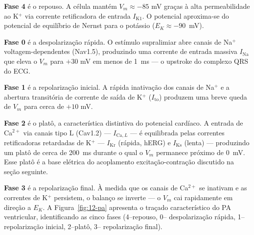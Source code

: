 \textbf{Fase 4} é o repouso. A célula mantém $V_m \approx -85$ mV graças
à alta permeabilidade ao K$^+$ via corrente retificadora de entrada
$I_{\mathrm{K1}}$. O potencial aproxima-se do potencial de equilíbrio de
Nernst para o potássio ($E_K \approx -90$~mV).

\textbf{Fase 0} é a despolarização rápida. O estímulo supralimiar abre
canais de Na$^+$ voltagem-dependentes (Nav1.5), produzindo uma corrente
de entrada massiva $I_{\mathrm{Na}}$ que eleva o $V_m$ para $+30$ mV em
menos de 1~ms --- o upstroke do complexo QRS do ECG.

\textbf{Fase 1} é a repolarização inicial. A rápida inativação dos
canais de Na$^+$ e a abertura transitória de corrente de saída de
K$^+$ ($I_{\mathrm{to}}$) produzem uma breve queda de $V_m$ para
cerca de $+10$ mV.

\textbf{Fase 2} é o platô, a característica distintiva do potencial
cardíaco. A entrada de Ca$^{2+}$ via canais tipo L (Cav1.2) --- $I_{\mathrm{Ca},L}$
--- é equilibrada pelas correntes retificadoras retardadas de K$^+$ --- $I_{\mathrm{Kr}}$
(rápida, hERG) e $I_{\mathrm{Ks}}$ (lenta) --- produzindo um platô de
cerca de 200~ms durante o qual o $V_m$ permanece próximo de 0~mV. Esse
platô é a base elétrica do acoplamento excitação-contração discutido na
seção seguinte.

\textbf{Fase 3} é a repolarização final. À medida que os canais de
Ca$^{2+}$ se inativam e as correntes de K$^+$ persistem, o balanço se
inverte --- o $V_m$ cai rapidamente em direção a $E_K$. A
Figura~\ref{fig:12-pa} apresenta o traçado característico do PA
ventricular, identificando as cinco fases (4--repouso, 0--
despolarização rápida, 1--repolarização inicial, 2--platô, 3--
repolarização final).

